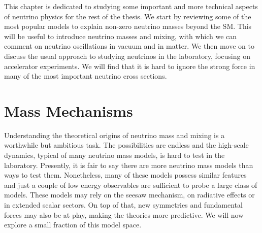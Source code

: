 \graphicspath{{}{theory/}{Diagrams/}}

This chapter is dedicated to studying some important and more technical aspects of neutrino physics for the rest of the thesis. We start by reviewing some of the most popular models to explain non-zero neutrino masses beyond the SM. This will be useful to introduce neutrino masses and mixing, with which we can comment on neutrino oscillations in vacuum and in matter. We then move on to discuss the usual approach to studying neutrinos in the laboratory, focusing on accelerator experiments. We will find that it is hard to ignore the strong force in many of the most important neutrino cross sections.

%
%

\section{Mass Mechanisms}

Understanding the theoretical origins of neutrino mass and mixing is a worthwhile but ambitious task. The possibilities are endless and the high-scale dynamics, typical of many neutrino mass models, is hard to test in the laboratory. Presently, it is fair to say there are more neutrino mass models than ways to test them. Nonetheless, many of these models possess similar features and just a couple of low energy observables are sufficient to probe a large class of models. These models may rely on the seesaw mechanism, on radiative effects or in extended scalar sectors. On top of that, new symmetries and fundamental forces may also be at play, making the theories more predictive. We will now explore a small fraction of this model space.

